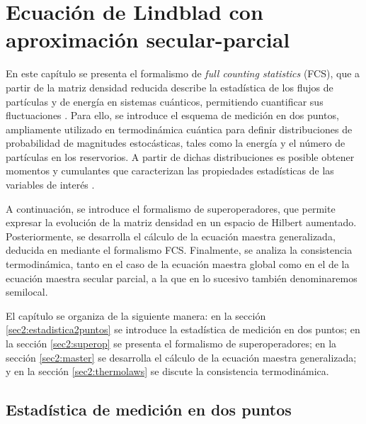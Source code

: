 
\chapter{Ecuación de Lindblad con aproximación secular-parcial}

En este capítulo se presenta el formalismo de \textit{full counting statistics} (FCS), que a partir de la matriz densidad reducida describe la estadística de los flujos de partículas y de energía en sistemas cuánticos, permitiendo cuantificar sus fluctuaciones \cite{esposito2009nonequilibrium,landi2024current}. Para ello, se introduce el esquema de medición en dos puntos, ampliamente utilizado en termodinámica cuántica para definir distribuciones de probabilidad de magnitudes estocásticas, tales como la energía y el número de partículas en los reservorios. A partir de dichas distribuciones es posible obtener momentos y cumulantes que caracterizan las propiedades estadísticas de las variables de interés \cite{esposito2009nonequilibrium}.

A continuación, se introduce el formalismo de superoperadores, que permite expresar la evolución de la matriz densidad en un espacio de Hilbert aumentado. Posteriormente, se desarrolla el cálculo de la ecuación maestra generalizada, deducida en \cite{potts2021thermodynamically} mediante el formalismo FCS. Finalmente, se analiza la consistencia termodinámica, tanto en el caso de la ecuación maestra global como en el de la ecuación maestra secular parcial, a la que en lo sucesivo también denominaremos semilocal.

El capítulo se organiza de la siguiente manera: en la sección \ref{sec2:estadistica2puntos} se introduce la estadística de medición en dos puntos; en la sección \ref{sec2:superop} se presenta el formalismo de superoperadores; en la sección \ref{sec2:master} se desarrolla el cálculo de la ecuación maestra generalizada; y en la sección \ref{sec2:thermolaws} se discute la consistencia termodinámica.

\label{sec2:estadistica}

\section{Estadística de medición en dos puntos}

